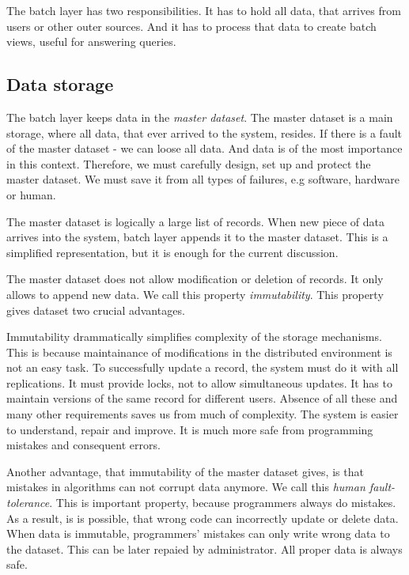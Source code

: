 
The batch layer has two responsibilities.
It has to hold all data, that arrives from users or other outer sources.
And it has to process that data to create batch views, useful for answering queries.

\subsection{Data storage}

The batch layer keeps data in the \textit{master dataset}.
The master dataset is a main storage, where all data, that ever arrived to the system, resides.
If there is a fault of the master dataset - we can loose all data.
And data is of the most importance in this context.
Therefore, we must carefully design, set up and protect the master dataset.
We must save it from all types of failures, e.g software, hardware or human.

The master dataset is logically a large list of records.
When new piece of data arrives into the system, batch layer appends it to the master dataset.
This is a simplified representation, but it is enough for the current discussion.

The master dataset does not allow modification or deletion of records.
It only allows to append new data.
We call this property \textit{immutability}.
This property gives dataset two crucial advantages.

Immutability drammatically simplifies complexity of the storage mechanisms.
This is because maintainance of modifications in the distributed environment is not an easy task.
To successfully update a record, the system must do it with all replications.
It must provide locks, not to allow simultaneous updates.
It has to maintain versions of the same record for different users.
Absence of all these and many other requirements saves us from much of complexity.
The system is easier to understand, repair and improve.
It is much more safe from programming mistakes and consequent errors.

Another advantage, that immutability of the master dataset gives, is that mistakes in algorithms can not corrupt data anymore.
We call this \textit{human fault-tolerance}.
This is important property, because programmers always do mistakes.
As a result, is is possible, that wrong code can incorrectly update or delete data.
When data is immutable, programmers' mistakes can only write wrong data to the dataset.
This can be later repaied by administrator.
All proper data is always safe.

